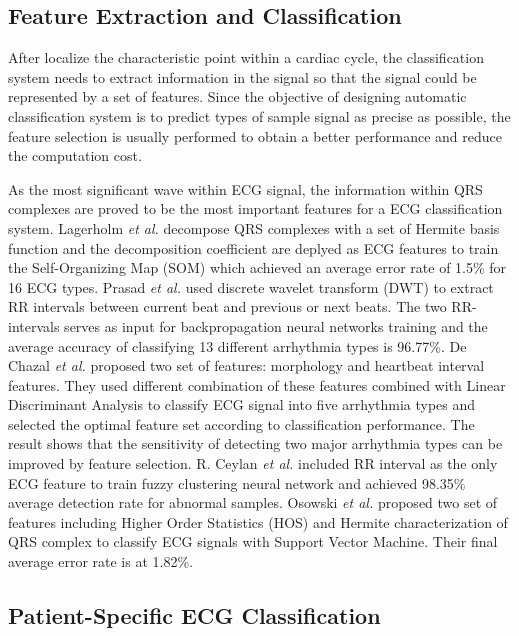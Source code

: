 \subsection{Feature Extraction and Classification}

After localize the characteristic point within a cardiac cycle, the classification system needs to extract information in the signal so that the signal could be represented by a set of features. Since the objective of designing automatic classification system is to predict types of sample signal as precise as possible, the feature selection is usually performed to obtain a better performance and reduce the computation cost. 

As the most significant wave within ECG signal, the information within QRS complexes are proved to be the most important features for a ECG classification system. Lagerholm \textit{et al.} decompose QRS complexes with a set of Hermite basis function and the decomposition coefficient are deplyed as ECG features to train the Self-Organizing Map (SOM) which achieved an average error rate of 1.5\% for 16 ECG types\cite{lagerholm2000clustering}. Prasad \textit{et al.}\cite{prasad2003classification} used discrete wavelet transform (DWT) to extract RR intervals between current beat and previous or next beats. The two RR-intervals serves as input for backpropagation neural networks training and the average accuracy of classifying 13 different arrhythmia types is 96.77\%. De Chazal \textit{et al.} proposed two set of features: morphology and heartbeat interval features. They used different combination of these features combined with Linear Discriminant Analysis to classify ECG signal into five arrhythmia types and selected the optimal feature set according to classification performance. The result shows that the sensitivity of detecting two major arrhythmia types can be improved by feature selection. R. Ceylan \textit{et al.}\cite{ceylan2009novel} included RR interval as the only ECG feature to train fuzzy clustering neural network and achieved 98.35\% average detection rate for abnormal samples. Osowski \textit{et al.} proposed two set of features including Higher Order Statistics (HOS) and Hermite characterization of QRS complex to classify ECG signals with Support Vector Machine. Their final average error rate is at 1.82\%\cite{osowski2004support}. %

\subsection{Patient-Specific ECG Classification}

